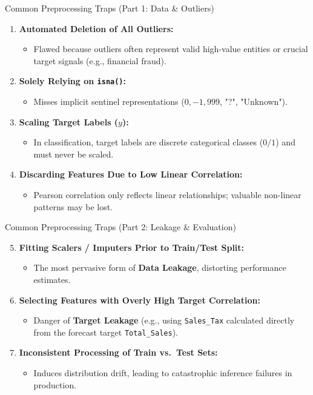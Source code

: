 \documentclass[aspectratio=169,11pt]{beamer}
\newcommand{\code}[1]{\texttt{#1}}
\begin{document}
\begin{frame}{Common Preprocessing Traps (Part 1: Data \& Outliers)}
\begin{enumerate}
  \item \textbf{Automated Deletion of All Outliers:}
  \begin{itemize}
    \item Flawed because outliers often represent valid high-value entities or crucial target signals (e.g., financial fraud).
  \end{itemize}
  \item \textbf{Solely Relying on \texttt{isna()}:}
  \begin{itemize}
    \item Misses implicit sentinel representations ($0, -1, 999$, "?", "Unknown").
  \end{itemize}
  \item \textbf{Scaling Target Labels ($y$):}
  \begin{itemize}
    \item In classification, target labels are discrete categorical classes ($0/1$) and must never be scaled.
  \end{itemize}
  \item \textbf{Discarding Features Due to Low Linear Correlation:}
  \begin{itemize}
    \item Pearson correlation only reflects linear relationships; valuable non-linear patterns may be lost.
  \end{itemize}
\end{enumerate}
\end{frame}

\begin{frame}{Common Preprocessing Traps (Part 2: Leakage \& Evaluation)}
\begin{enumerate}
  \setcounter{enumi}{4}
  \item \textbf{Fitting Scalers / Imputers Prior to Train/Test Split:}
  \begin{itemize}
    \item The most pervasive form of \textbf{Data Leakage}, distorting performance estimates.
  \end{itemize}
  \item \textbf{Selecting Features with Overly High Target Correlation:}
  \begin{itemize}
    \item Danger of \textbf{Target Leakage} (e.g., using \code{Sales\_Tax} calculated directly from the forecast target \code{Total\_Sales}).
  \end{itemize}
  \item \textbf{Inconsistent Processing of Train vs.\ Test Sets:}
  \begin{itemize}
    \item Induces distribution drift, leading to catastrophic inference failures in production.
  \end{itemize}
\end{enumerate}
\end{frame}
\end{document}
